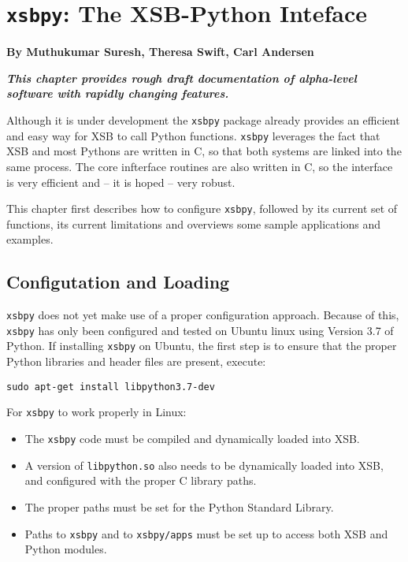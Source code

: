 
\chapter[XSB and Python]{{\tt xsbpy}: The XSB-Python Inteface}

\begin{center}
  {\Large {\bf By Muthukumar Suresh, Theresa Swift, Carl Andersen}}
\end{center}

\noindent
{\large {\bf {\em This chapter provides rough draft documentation of
      alpha-level software with rapidly changing features.}}}

%

Although it is under development the {\tt xsbpy} package already
provides an efficient and easy way for XSB to call Python functions.
{\tt xsbpy} leverages the fact that XSB and most Pythons are written
in C, so that both systems are linked into the same process. The core
infterface routines are also written in C, so the interface is very
efficient and -- it is hoped -- very robust.

This chapter first describes how to configure {\tt xsbpy}, followed by
its current set of functions, its current limitations and overviews
some sample applications and examples.

\section{Configutation and Loading}

{\tt xsbpy} does not yet make use of a proper configuration approach.
Because of this, {\tt xsbpy} has only been configured and tested on
Ubuntu linux using Version 3.7 of Python.  If installing {\tt xsbpy}
on Ubuntu, the first step is to ensure that the proper Python
libraries and header files are present, execute:

{\tt sudo apt-get install libpython3.7-dev}



For {\tt xsbpy} to work properly in Linux:
\begin{itemize}
\item The {\tt xsbpy} code must be compiled and dynamically loaded into XSB.
\item A version of {\tt libpython.so} also needs to be dynamically
  loaded into XSB, and configured with the proper C library paths.
\item The proper paths must be set for the Python Standard Library.
\item Paths to {\tt xsbpy} and to {\tt xsbpy/apps} must be set up to
  access both XSB and Python modules.
\end{itemize}

